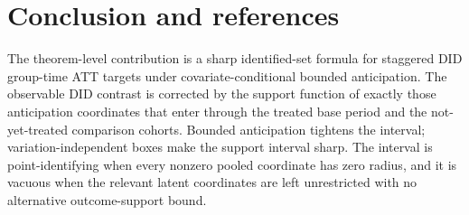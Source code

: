 \documentclass[11pt]{article}
\theoremstyle{definition}
\theoremstyle{plain}
\theoremstyle{remark}
\begin{document}
\section{Conclusion and references}
The theorem-level contribution is a sharp identified-set formula for staggered
DID group-time ATT targets under covariate-conditional bounded anticipation.  The
observable DID contrast is corrected by the support function of exactly those
anticipation coordinates that enter through the treated base period and the
not-yet-treated comparison cohorts.  Bounded anticipation tightens the interval;
variation-independent boxes make the support interval sharp.  The interval is
point-identifying when every nonzero pooled coordinate has zero radius, and it is
vacuous when the relevant latent coordinates are left unrestricted with no
alternative outcome-support bound.
\end{document}
